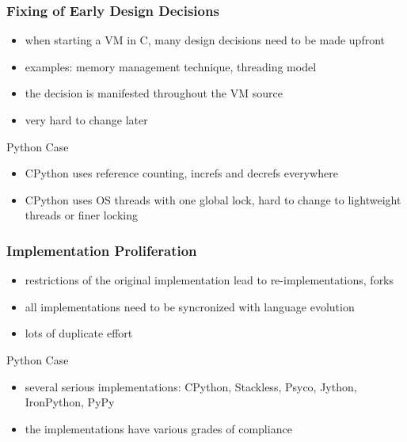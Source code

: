 \documentclass[utf8x]{beamer}
\begin{document}
\begin{frame}
  \frametitle{Fixing of Early Design Decisions}
  \begin{itemize}
  \item when starting a VM in C, many design decisions need to be made upfront
  \item examples: memory management technique, threading model
  \item the decision is manifested throughout the VM source
  \item very hard to change later
  \end{itemize}
  \pause
  \begin{block}{
    Python Case}
    \begin{itemize}
    \item
      CPython uses reference counting, increfs and decrefs everywhere
    \item
      CPython uses OS threads with one global lock, hard to change to
      lightweight threads or finer locking
    \end{itemize}
  \end{block}
\end{frame}

\begin{frame}
  \frametitle{Implementation Proliferation}
  \begin{itemize}
  \item
    restrictions of the original implementation lead to re-implementations,
    forks
  \item
    all implementations need to be syncronized with language evolution
  \item
    lots of duplicate effort
  \end{itemize}
  \pause
  \begin{block}{
    Python Case}
    \begin{itemize}
    \item
      several serious implementations: CPython, Stackless, Psyco, Jython,
      IronPython, PyPy
    \item
      the implementations have various grades of compliance
    \end{itemize}
  \end{block}
\end{frame}
\end{document}
